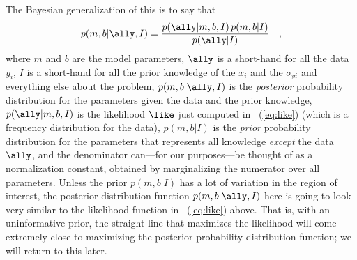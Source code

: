 \documentclass[12pt,twoside,pdftex]{article}
\begin{document}
The Bayesian generalization of this is to say that
\begin{equation}
p(m,b|\ally,I) = \frac{p(\ally|m,b,I)\,p(m,b|I)}{p(\ally|I)} \quad ,
\end{equation}
where $m$ and $b$ are the model parameters, $\ally$ is a short-hand
for all the data $y_i$, $I$ is a short-hand for all the prior
knowledge of the $x_i$ and the $\sigma_{yi}$ and everything else about
the problem, $p(m,b|\ally,I)$ is the \emph{posterior}
probability distribution for the parameters given the data and the
prior knowledge, $p(\ally|m,b,I)$ is the likelihood $\like$ just
computed in \equationname~(\ref{eq:like}) (which is a frequency
distribution for the data), $p(m,b|I)$ is the \emph{prior} probability
distribution for the parameters that represents all knowledge
\emph{except} the data $\ally$, and the denominator can---for our
purposes---be thought of as a normalization constant, obtained by
marginalizing the numerator over all parameters. Unless the prior
$p(m,b|I)$ has a lot of variation in the region of interest, the
posterior distribution function $p(m,b|\ally,I)$ here is going to look
very similar to the likelihood function in
\equationname~(\ref{eq:like}) above.  That is, with an uninformative
prior, the straight line that maximizes the likelihood will come
extremely close to maximizing the posterior probability distribution
function; we will return to this later.
\end{document}
